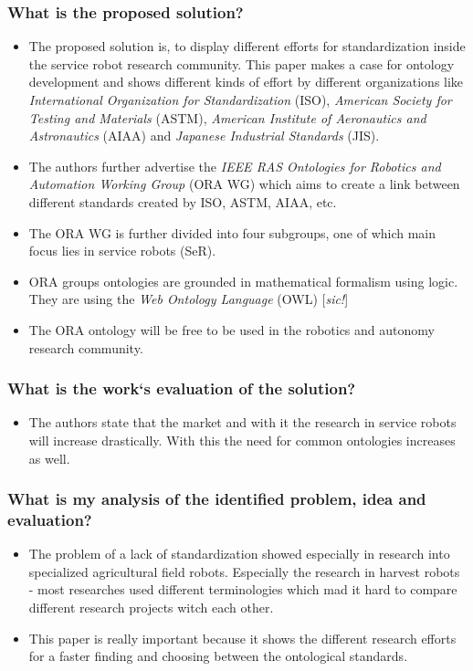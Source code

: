 \subsubsection*{What is the proposed solution?}
\begin{itemize}
    \item The proposed solution is, to display different efforts for standardization inside the service robot research community. This paper makes a case for ontology development and shows different kinds of effort by different organizations like \emph{International Organization for Standardization} (ISO), \emph{American Society for Testing and Materials} (ASTM), \emph{American Institute of Aeronautics and Astronautics} (AIAA) and \emph{Japanese Industrial Standards} (JIS). 
    \item The authors further advertise the \emph{IEEE RAS Ontologies for Robotics and Automation Working Group} (ORA WG) which aims to create a link between different standards created by ISO, ASTM, AIAA, etc.
    \item The ORA WG is further divided into four subgroups, one of which main focus lies in service robots (SeR).
    \item ORA groups ontologies are grounded in mathematical formalism using logic. They are using the \emph{Web Ontology Language} (OWL) [\emph{sic!}]
    \item The ORA ontology will be free to be used in the robotics and autonomy research community.
\end{itemize}
\subsubsection*{What is the work`s evaluation of the solution?}
\begin{itemize}
    \item The authors state that the market and with it the research in service robots will increase drastically. With this the need for common ontologies increases as well. 
\end{itemize}
\subsubsection*{What is my analysis of the identified problem, idea and evaluation?}
\begin{itemize}
    \item The problem of a lack of standardization showed especially in research into specialized agricultural field robots. Especially the research in harvest robots - most researches used different terminologies which mad it hard to compare different research projects witch each other.
    \item This paper is really important because it shows the different research efforts for a faster finding and choosing between the ontological standards.
\end{itemize}
